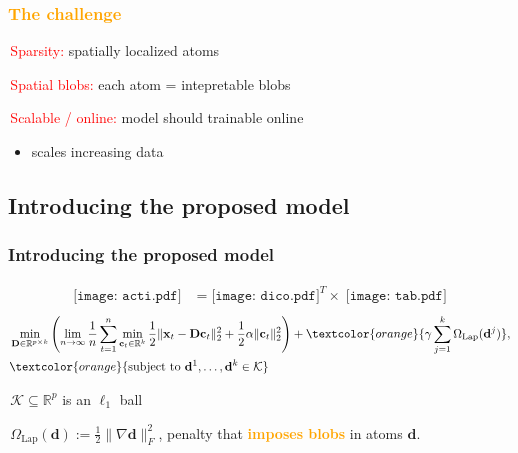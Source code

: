 \documentclass{beamer}
\def\mydot{\structure{\rule{1ex}{1ex}}\,}
\def\B#1{\mathbf{#1}}
\def\emph#1{\textbf{\textcolor{orange}{#1}}}
\begin{document}
\begin{frame}
  \frametitle{\emph{The challenge}}\Large
  \bigskip
  \bigskip
  \mydot \textcolor{red}{Sparsity:} spatially localized atoms

  \bigskip

  \mydot \textcolor{red}{Spatial blobs:} each atom = intepretable blobs

  \bigskip
  
  \mydot \textcolor{red}{Scalable / online:} model should trainable online
  \begin{itemize}
  \item scales increasing data
  \end{itemize}
  
\end{frame}


\subsection{Introducing the proposed model}
\begin{frame}
  \frametitle{Introducing the proposed model}
  \vspace{-2em}
    \begin{equation*}
      \begin{split}
      {\texttt{[image: acti.pdf]}} &= {\texttt{[image: dico.pdf]}^T} \times \;{\texttt{[image: tab.pdf]}}
      \end{split}
    \end{equation*}
\vspace{-1.5em}
\begin{eqnarray*}
  \begin{split}
    &\min_{\B{D} \in \mathbb R^{p \times k}}\left(\lim_{n \rightarrow \infty}\frac{1}{n}\sum_{t=1}^n\min_{\B{c}_t \in \mathbb R^{k}}\frac{1}{2} \|\B{x}_t-\B{D}\B{c}_t\|_2^2 +  \frac{1}{2}\alpha\|\B{c}_t\|_2^2\right) + \textcolor{orange}{\gamma\sum_{j=1}^k\Omega_{\text{Lap}}(\B{d}^j)},\\
    &\textcolor{orange}{\text{subject to } \B{d}^1,\ldots,\B{d}^k \in \mathcal K}
  \end{split}
\end{eqnarray*}


 {
  \mydot $\mathcal K \subseteq \mathbb R^p$ is an $\ell_1$ ball

  \mydot $\Omega_{\text{Lap}}(\B{d}) := \frac{1}{2}\|\nabla \B{d}\|_F^2$, penalty that \emph{imposes blobs} in atoms $\B{d}$.
}

\end{frame}
\end{document}
